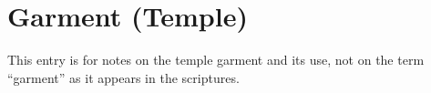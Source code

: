\section{Garment (Temple)}
	\label{GARMENT}
	
	This entry is for notes on the temple garment and its use, not on the term ``garment'' as it appears in the scriptures.
	






	
	
